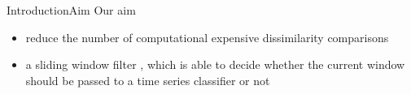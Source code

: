 \begin{frame}{Introduction}{Aim}
    Our aim
    \begin{itemize}
        \item reduce the number of computational expensive dissimilarity comparisons
        \pause
        \item a sliding window filter \cite{lesti2017filter}, which is able to decide whether the current window should be passed to a time series classifier or not
    \end{itemize}
\end{frame}
